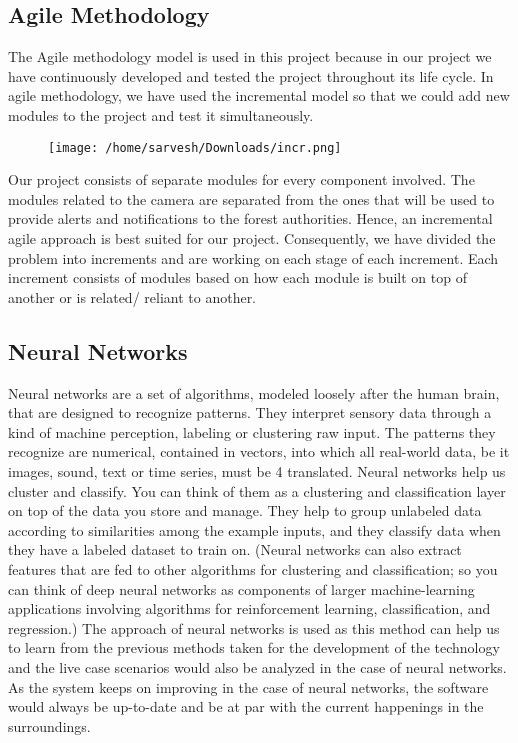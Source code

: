 \documentclass[12pt]{extarticle}
\begin{document}
\subsection{Agile Methodology}
The Agile methodology model is used in this project because in our project we have 
continuously developed and tested the project throughout its life cycle. In agile methodology, we 
have used the incremental model so that we could add new modules to the project and test it simultaneously.

\begin{figure}[ht]
	\centering
	\texttt{[image: /home/sarvesh/Downloads/incr.png]}
\end{figure}

\newpage
Our project consists of separate modules for every component involved. The modules related to the camera are separated from the ones that will be used to provide alerts and notifications to the forest authorities. Hence, an incremental agile approach is best suited for our project. Consequently, we have divided the problem into increments and are working on each stage of each increment. Each increment consists of modules based on how each module is built on top of another or is related/ reliant to another.

\subsection{Neural Networks}
Neural networks are a set of algorithms, modeled loosely after the human brain, that are 
designed to recognize patterns. They interpret sensory data through a kind of machine 
perception, labeling or clustering raw input. The patterns they recognize are numerical, contained 
in vectors, into which all real-world data, be it images, sound, text or time series, must be 4 
translated. Neural networks help us cluster and classify. You can think of them as a clustering 
and classification layer on top of the data you store and manage. They help to group unlabeled 
data according to similarities among the example inputs, and they classify data when they have a 
labeled dataset to train on. (Neural networks can also extract features that are fed to other 
algorithms for clustering and classification; so you can think of deep neural networks as 
components of larger machine-learning applications involving algorithms for reinforcement 
learning, classification, and regression.) The approach of neural networks is used as this method 
can help us to learn from the previous methods taken for the development of the technology and 
the live case scenarios would also be analyzed in the case of neural networks. As the system 
keeps on improving in the case of neural networks, the software would always be up-to-date and 
be at par with the current happenings in the surroundings.
\end{document}
